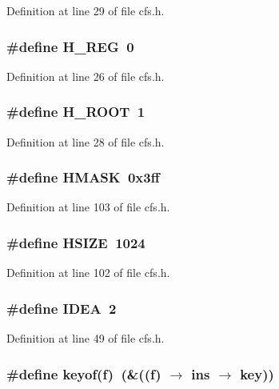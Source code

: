 Definition at line 29 of file cfs.h.
\subsubsection{\setlength{\rightskip}{0pt plus 5cm}\#define H\_\-REG\ 0}\label{cfs_8h_a0}




Definition at line 26 of file cfs.h.
\subsubsection{\setlength{\rightskip}{0pt plus 5cm}\#define H\_\-ROOT\ 1}\label{cfs_8h_a2}




Definition at line 28 of file cfs.h.
\subsubsection{\setlength{\rightskip}{0pt plus 5cm}\#define HMASK\ 0x3ff}\label{cfs_8h_a16}




Definition at line 103 of file cfs.h.
\subsubsection{\setlength{\rightskip}{0pt plus 5cm}\#define HSIZE\ 1024}\label{cfs_8h_a15}




Definition at line 102 of file cfs.h.
\subsubsection{\setlength{\rightskip}{0pt plus 5cm}\#define IDEA\ 2}\label{cfs_8h_a9}




Definition at line 49 of file cfs.h.
\subsubsection{\setlength{\rightskip}{0pt plus 5cm}\#define keyof(f)\ (\&((f) $\rightarrow$ {\bf ins} $\rightarrow$ {\bf key}))}\label{cfs_8h_a22}




